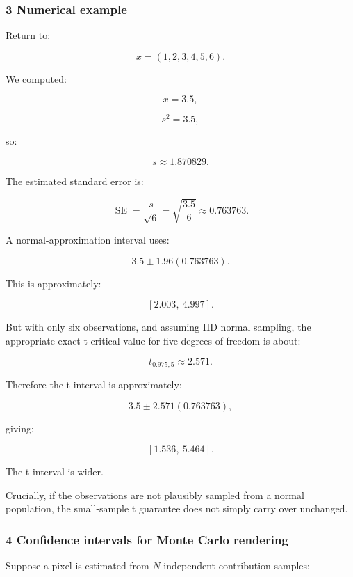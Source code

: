 \subsubsection{3 Numerical example}\label{02-foundations-ii-ch030-numerical-example}

\hypertarget{02-foundations-ii-ch030-numerical-example}{}

Return to:

\[
 x=(1,2,3,4,5,6).
\]

We computed:

\[
 \bar x=3.5,
\]

\[
 s^2=3.5,
\]

so:

\[
 s\approx1.870829.
\]

The estimated standard error is:

\[
 \operatorname{SE}= \frac{s}{\sqrt6} = \sqrt{\frac{3.5}{6}} \approx0.763763.
\]

A normal-approximation interval uses:

\[
 3.5\pm1.96(0.763763).
\]

This is approximately:

\[
 \boxed{[2.003,\ 4.997]}.
\]

But with only six observations, and assuming IID normal sampling, the appropriate exact t critical value for five degrees of freedom is about:

\[
 t_{0.975,5}\approx2.571.
\]

Therefore the t interval is approximately:

\[
 3.5\pm2.571(0.763763),
\]

giving:

\[
 \boxed{[1.536,\ 5.464]}.
\]

The t interval is wider.

Crucially, if the observations are not plausibly sampled from a normal population, the small-sample t guarantee does not simply carry over unchanged.

\subsubsection{4 Confidence intervals for Monte Carlo rendering}\label{02-foundations-ii-ch030-confidence-intervals-for-monte-carlo-rendering}

\hypertarget{02-foundations-ii-ch030-confidence-intervals-for-monte-carlo-rendering}{}

Suppose a pixel is estimated from \(N\) independent contribution samples:

